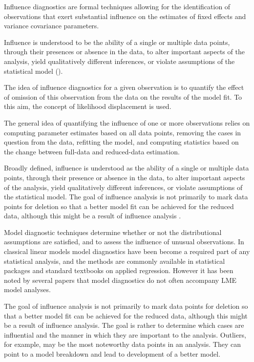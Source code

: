 \documentclass[12pt, a4paper]{report}
\theoremstyle{plain}
\theoremstyle{definition}
\theoremstyle{remark}
\begin{document}
Influence diagnostics are formal techniques allowing for the identification of observations that exert substantial 
influence on the estimates of fixed effects and variance covariance parameters. 


Influence is understood to be the ability of a single or multiple
data points, through their presences or absence in the data, to
alter important aspects of the analysis, yield qualitatively
different inferences, or violate assumptions of the statistical
model (\citep{schabenberger}).




The idea of influence diagnostics for a given observation is to quantify the effect of omission of this observation 
from the data on the results of the model fit. To this aim, the concept of likelihood displacement is used. 

The general idea of quantifying the influence of one or more observations relies on computing parameter estimates based on all data points, removing the cases in question from the data, refitting the model, and computing statistics based on the change between full-data and reduced-data estimation. 


Broadly defined, influence is understood as the ability of a single or multiple data points, through their presence or absence in the data, to alter important aspects of the analysis, yield qualitatively different inferences, or violate assumptions of the statistical model. The goal of influence analysis is not primarily to mark data points for deletion so that a better model fit can be achieved for the reduced data, although this might be a result of influence analysis \citep{schabenberger}.

Model diagnostic techniques determine whether or not the distributional assumptions are satisfied, and to assess the influence of unusual observations. In classical linear models model diagnostics have been become a required part of any statistical analysis, and the methods are commonly available in statistical packages and standard textbooks on applied regression. However it has been noted by several papers that model diagnostics do not often accompany LME model analyses.

The goal of influence analysis is not primarily to mark data
points for deletion so that a better model fit can be achieved for the reduced data, although this might be a
result of influence analysis. The goal is rather to determine which cases are influential and the manner in
which they are important to the analysis. Outliers, for example, may be the most noteworthy data points in
an analysis. They can point to a model breakdown and lead to development of a better model.
\end{document}
